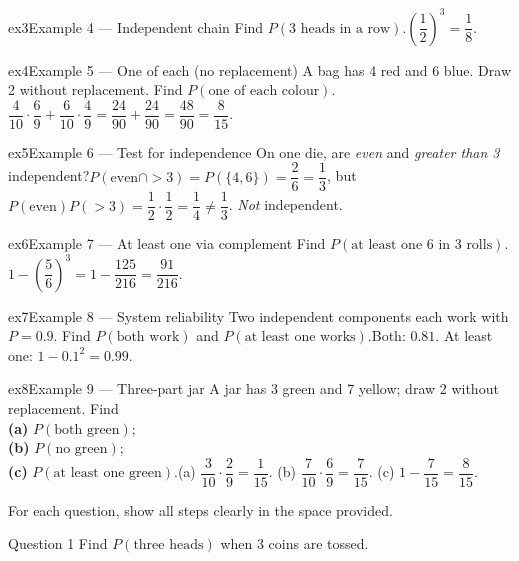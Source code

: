 \documentclass[11pt]{article}
\begin{document}
\begin{example}{ex3}{Example 4 --- Independent chain}
Find $P(\text{3 heads in a row})$.\soln $\left(\dfrac12\right)^3=\dfrac18$.
\end{example}

\begin{example}{ex4}{Example 5 --- One of each (no replacement)}
A bag has 4 red and 6 blue. Draw 2 without replacement. Find $P(\text{one of each colour})$.\soln $\dfrac{4}{10}\cdot\dfrac69+\dfrac{6}{10}\cdot\dfrac49=\dfrac{24}{90}+\dfrac{24}{90}=\dfrac{48}{90}=\dfrac{8}{15}$.
\end{example}

\begin{example}{ex5}{Example 6 --- Test for independence}
On one die, are \emph{even} and \emph{greater than 3} independent?\soln $P(\text{even}\cap{>}3)=P(\{4,6\})=\dfrac26=\dfrac13$, but $P(\text{even})P({>}3)=\dfrac12\cdot\dfrac12=\dfrac14\ne\dfrac13$. \emph{Not} independent.
\end{example}

\begin{example}{ex6}{Example 7 --- At least one via complement}
Find $P(\text{at least one 6 in 3 rolls})$.\soln $1-\left(\dfrac56\right)^3=1-\dfrac{125}{216}=\dfrac{91}{216}$.
\end{example}

\begin{example}{ex7}{Example 8 --- System reliability}
Two independent components each work with $P=0.9$. Find $P(\text{both work})$ and $P(\text{at least one works})$.\soln Both: $0.81$. At least one: $1-0.1^2=0.99$.
\end{example}

\begin{example}{ex8}{Example 9 --- Three-part jar}
A jar has 3 green and 7 yellow; draw 2 without replacement. Find \\ \textbf{(a)} $P(\text{both green})$; \\ \textbf{(b)} $P(\text{no green})$; \\ \textbf{(c)} $P(\text{at least one green})$.\soln (a) $\dfrac{3}{10}\cdot\dfrac29=\dfrac{1}{15}$. (b) $\dfrac{7}{10}\cdot\dfrac69=\dfrac{7}{15}$. (c) $1-\dfrac{7}{15}=\dfrac{8}{15}$.
\end{example}

\clearpage
{}
For each question, show all steps clearly in the space provided.

\begin{qbox}{Question 1}
Find $P(\text{three heads})$ when 3 coins are tossed.\workspace{2.4cm}
\end{qbox}
\end{document}
